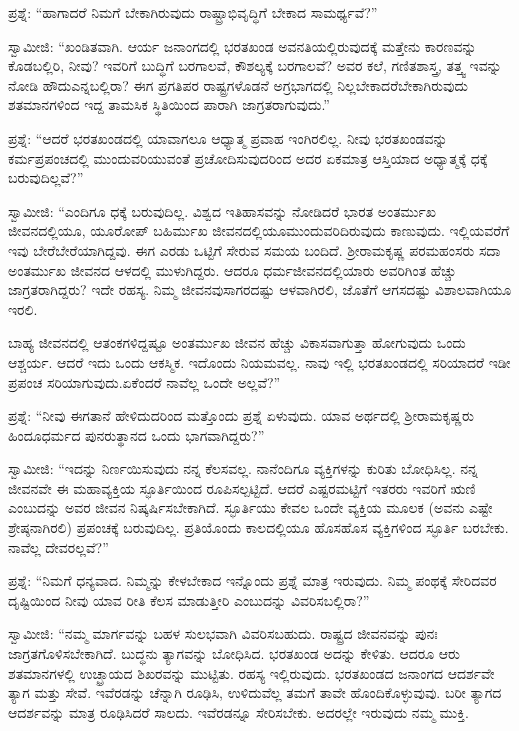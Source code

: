 \vskip 5pt

ಪ್ರಶ್ನೆ: “ಹಾಗಾದರೆ ನಿಮಗೆ ಬೇಕಾಗಿರುವುದು ರಾಷ್ಟ್ರಾಭಿವೃದ್ಧಿಗೆ ಬೇಕಾದ ಸಾಮ\-ರ್ಥ್ಯವೆ?”

\vskip 5pt

ಸ್ವಾಮೀಜಿ: “ಖಂಡಿತವಾಗಿ. ಆರ್ಯ ಜನಾಂಗದಲ್ಲಿ ಭರತಖಂಡ ಅವನತಿಯಲ್ಲಿರು\-ವುದಕ್ಕೆ ಮತ್ತೇನು ಕಾರಣವನ್ನು ಕೊಡಬಲ್ಲಿರಿ, ನೀವು? ಇವರಿಗೆ ಬುದ್ಧಿಗೆ ಬರಗಾಲವೆ, ಕೌಶಲ್ಯಕ್ಕೆ ಬರಗಾಲವೆ? ಅವರ ಕಲೆ, ಗಣಿತಶಾಸ್ತ್ರ, ತತ್ತ್ವ ಇವನ್ನು ನೋಡಿ ಹೌದು\break ಎನ್ನಬಲ್ಲಿರಾ? ಈಗ ಪ್ರಗತಿಪರ ರಾಷ್ಟ್ರಗಳೊಡನೆ ಅಗ್ರಭಾಗದಲ್ಲಿ ನಿಲ್ಲಬೇಕಾದರೆ\break ಬೇಕಾಗಿರುವುದು ಶತಮಾನಗಳಿಂದ ಇದ್ದ ತಾಮಸಿಕ ಸ್ಥಿತಿಯಿಂದ ಪಾರಾಗಿ ಜಾಗ್ರತರಾಗುವುದು.”

\vskip 5pt

ಪ್ರಶ್ನೆ: “ಆದರೆ ಭರತಖಂಡದಲ್ಲಿ ಯಾವಾಗಲೂ ಆಧ್ಯಾತ್ಮ ಪ್ರವಾಹ ಇಂಗಿರಲಿಲ್ಲ. ನೀವು ಭರತಖಂಡವನ್ನು ಕರ್ಮಪ್ರಪಂಚದಲ್ಲಿ ಮುಂದುವರಿಯುವಂತೆ ಪ್ರಚೋದಿಸುವುದರಿಂದ ಅದರ ಏಕಮಾತ್ರ ಆಸ್ತಿಯಾದ ಅಧ್ಯಾತ್ಮಕ್ಕೆ ಧಕ್ಕೆ ಬರುವುದಿಲ್ಲವೆ?”

\eject

ಸ್ವಾಮೀಜಿ: “ಎಂದಿಗೂ ಧಕ್ಕೆ ಬರುವುದಿಲ್ಲ. ವಿಶ್ವದ ಇತಿಹಾಸವನ್ನು ನೋಡಿದರೆ ಭಾರತ ಅಂತರ್ಮುಖ ಜೀವನದಲ್ಲಿಯೂ, ಯೂರೋಪ್​ ಬಹಿರ್ಮುಖ ಜೀವನದಲ್ಲಿಯೂ\break ಮುಂದುವರಿದಿರುವುದು ಕಾಣುವುದು. ಇಲ್ಲಿಯವರೆಗೆ ಇವು ಬೇರೆಬೇರೆಯಾಗಿದ್ದವು. ಈಗ ಎರಡು ಒಟ್ಟಿಗೆ ಸೇರುವ ಸಮಯ ಬಂದಿದೆ. ಶ‍್ರೀರಾಮಕೃಷ್ಣ ಪರಮಹಂಸರು ಸದಾ ಅಂತರ್ಮುಖ ಜೀವನದ ಆಳದಲ್ಲಿ ಮುಳುಗಿದ್ದರು. ಆದರೂ ಧರ್ಮಜೀವನದಲ್ಲಿ\break ಯಾರು ಅವರಿಗಿಂತ ಹೆಚ್ಚು ಜಾಗ್ರತರಾಗಿದ್ದರು? ಇದೇ ರಹಸ್ಯ. ನಿಮ್ಮ ಜೀವನವು\break ಸಾಗರದಷ್ಟು ಆಳವಾಗಿರಲಿ, ಜೊತೆಗೆ ಆಗಸದಷ್ಟು ವಿಶಾಲವಾಗಿಯೂ ಇರಲಿ.

ಬಾಹ್ಯ ಜೀವನದಲ್ಲಿ ಆತಂಕಗಳಿದ್ದಷ್ಟೂ ಅಂತರ್ಮುಖ ಜೀವನ ಹೆಚ್ಚು ವಿಕಾಸವಾಗುತ್ತಾ ಹೋಗುವುದು ಒಂದು ಆಶ್ಚರ್ಯ. ಆದರೆ ಇದು ಒಂದು ಆಕಸ್ಮಿಕ. ಇದೊಂದು ನಿಯಮವಲ್ಲ. ನಾವು ಇಲ್ಲಿ ಭರತಖಂಡದಲ್ಲಿ ಸರಿಯಾದರೆ ಇಡೀ ಪ್ರಪಂಚ ಸರಿಯಾಗುವುದು.\break ಏಕೆಂದರೆ ನಾವೆಲ್ಲ ಒಂದೇ ಅಲ್ಲವೆ?”

ಪ್ರಶ್ನೆ: “ನೀವು ಈಗತಾನೆ ಹೇಳಿದುದರಿಂದ ಮತ್ತೊಂದು ಪ್ರಶ್ನೆ ಏಳುವುದು. ಯಾವ ಅರ್ಥದಲ್ಲಿ ಶ‍್ರೀರಾಮಕೃಷ್ಣರು ಹಿಂದೂಧರ್ಮದ ಪುನರುತ್ಥಾನದ ಒಂದು ಭಾಗವಾಗಿದ್ದರು?”

ಸ್ವಾಮೀಜಿ: “ಇದನ್ನು ನಿರ್ಣಯಿಸುವುದು ನನ್ನ ಕೆಲಸವಲ್ಲ. ನಾನೆಂದಿಗೂ ವ್ಯಕ್ತಿಗಳನ್ನು ಕುರಿತು ಬೋಧಿಸಿಲ್ಲ. ನನ್ನ ಜೀವನವೇ ಈ ಮಹಾವ್ಯಕ್ತಿಯ ಸ್ಫೂರ್ತಿಯಿಂದ ರೂಪಿಸಲ್ಪಟ್ಟಿದೆ. ಆದರೆ ಎಷ್ಟರಮಟ್ಟಿಗೆ ಇತರರು ಇವರಿಗೆ ಋಣಿ ಎಂಬುದನ್ನು ಅವರ ಜೀವನ ನಿಷ್ಕರ್ಷಿಸಬೇಕಾಗಿದೆ. ಸ್ಫೂರ್ತಿಯು ಕೇವಲ ಒಂದೇ ವ್ಯಕ್ತಿಯ ಮೂಲಕ (ಅವನು ಎಷ್ಟೇ ಶ್ರೇಷ್ಠನಾಗಿರಲಿ) ಪ್ರಪಂಚಕ್ಕೆ ಬರುವುದಿಲ್ಲ. ಪ್ರತಿಯೊಂದು ಕಾಲದಲ್ಲಿಯೂ ಹೊಸಹೊಸ ವ್ಯಕ್ತಿಗಳಿಂದ ಸ್ಫೂರ್ತಿ ಬರಬೇಕು. ನಾವೆಲ್ಲ ದೇವರಲ್ಲವೆ?”

ಪ್ರಶ್ನೆ: “ನಿಮಗೆ ಧನ್ಯವಾದ. ನಿಮ್ಮನ್ನು ಕೇಳಬೇಕಾದ ಇನ್ನೊಂದು ಪ್ರಶ್ನೆ ಮಾತ್ರ ಇರುವುದು. ನಿಮ್ಮ ಪಂಥಕ್ಕೆ ಸೇರಿದವರ ದೃಷ್ಟಿಯಿಂದ ನೀವು ಯಾವ ರೀತಿ ಕೆಲಸ ಮಾಡುತ್ತೀರಿ ಎಂಬುದನ್ನು ವಿವರಿಸಬಲ್ಲಿರಾ?”

ಸ್ವಾಮೀಜಿ: “ನಮ್ಮ ಮಾರ್ಗವನ್ನು ಬಹಳ ಸುಲಭವಾಗಿ ವಿವರಿಸಬಹುದು. ರಾಷ್ಟ್ರದ ಜೀವನವನ್ನು ಪುನಃ ಜಾಗ್ರತಗೊಳಿಸಬೇಕಾಗಿದೆ. ಬುದ್ಧನು ತ್ಯಾಗವನ್ನು ಬೋಧಿಸಿದ. ಭರತಖಂಡ ಅದನ್ನು ಕೇಳಿತು. ಆದರೂ ಆರು ಶತಮಾನಗಳಲ್ಲಿ ಉಚ್ಛ್ರಾಯದ ಶಿಖರವನ್ನು ಮುಟ್ಟಿತು. ರಹಸ್ಯ ಇಲ್ಲಿರುವುದು. ಭರತಖಂಡದ ಜನಾಂಗದ ಆದರ್ಶವೇ ತ್ಯಾಗ ಮತ್ತು ಸೇವೆ. ಇವೆರಡನ್ನು ಚೆನ್ನಾಗಿ ರೂಢಿಸಿ, ಉಳಿದುವೆಲ್ಲ ತಮಗೆ ತಾವೇ ಹೊಂದಿಕೊಳ್ಳುವುವು. ಬರೀ ತ್ಯಾಗದ ಆದರ್ಶವನ್ನು ಮಾತ್ರ ರೂಢಿಸಿದರೆ ಸಾಲದು. ಇವೆರಡನ್ನೂ ಸೇರಿಸಬೇಕು. ಅದರಲ್ಲೇ ಇರುವುದು ನಮ್ಮ ಮುಕ್ತಿ.

\vspace{-0.5cm}

